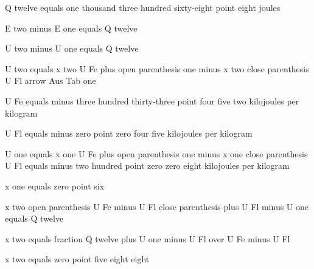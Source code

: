 Q twelve equals one thousand three hundred sixty-eight point eight joules

E two minus E one equals Q twelve

U two minus U one equals Q twelve

U two equals x two U Fe plus open parenthesis one minus x two close parenthesis U Fl arrow Aus Tab one

U Fe equals minus three hundred thirty-three point four five two kilojoules per kilogram

U Fl equals minus zero point zero four five kilojoules per kilogram

U one equals x one U Fe plus open parenthesis one minus x one close parenthesis U Fl equals minus two hundred point zero zero eight kilojoules per kilogram

x one equals zero point six

x two open parenthesis U Fe minus U Fl close parenthesis plus U Fl minus U one equals Q twelve

x two equals fraction Q twelve plus U one minus U Fl over U Fe minus U Fl

x two equals zero point five eight eight